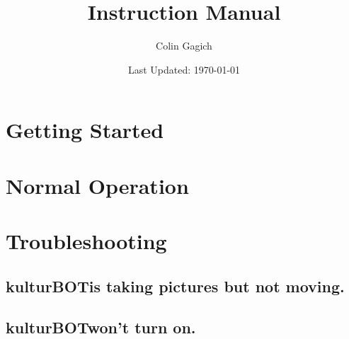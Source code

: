 \documentclass[]{article}
\title{\kbspace Instruction Manual}
\author{Colin Gagich}
\date{Last Updated: \today}
\newcommand{\kb}{kulturBOT}
\newcommand{\kbspace}{\kb \space}
\begin{document}
\maketitle

\newpage

\tableofcontents
\newpage

\section{Getting Started}

\section{Normal Operation}

\section{Troubleshooting}
\subsection{\kbspace is taking pictures but not moving.}
\subsection{\kbspace won't turn on.}
\end{document}

